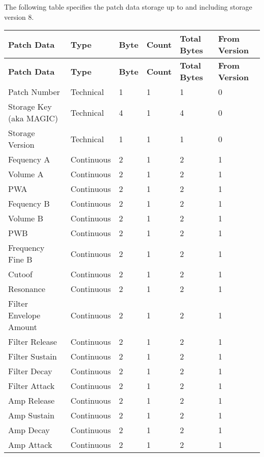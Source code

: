 The following table specifies the patch data storage up to and including storage version 8. 

\footnotesize
\renewcommand{\arraystretch}{1.3}

\begin{longtable}[l]{p{5cm}|p{2cm}|p{1.5cm}|p{1.5cm}|p{2cm}|p{2.5cm}} 
\textbf{Patch Data} & \textbf{Type} & \textbf{Byte} & \textbf{Count} & \textbf{Total Bytes} & \textbf{From Version} \\ \hline
\endfirsthead
\textbf{Patch Data} & \textbf{Type} & \textbf{Byte} & \textbf{Count} & \textbf{Total Bytes} & \textbf{From Version} \\ \hline
\endhead 
Patch Number & Technical & 1 & 1 & 1 & 0 \\ \hline
Storage Key (aka MAGIC) & Technical & 4 & 1 & 4 & 0 \\ \hline
Storage Version & Technical & 1 & 1 & 1 & 0 \\ \hline
Fequency A & Continuous & 2 & 1 & 2 & 1 \\ \hline
Volume A & Continuous & 2 & 1 & 2 & 1 \\ \hline
PWA & Continuous & 2 & 1 & 2 & 1 \\ \hline
Fequency B & Continuous & 2 & 1 & 2 & 1 \\ \hline
Volume B & Continuous & 2 & 1 & 2 & 1 \\ \hline
PWB & Continuous & 2 & 1 & 2 & 1 \\ \hline
Frequency Fine B & Continuous & 2 & 1 & 2 & 1 \\ \hline
Cutoof & Continuous & 2 & 1 & 2 & 1 \\ \hline
Resonance & Continuous & 2 & 1 & 2 & 1 \\ \hline
Filter Envelope Amount & Continuous & 2 & 1 & 2 & 1 \\ \hline
Filter Release & Continuous & 2 & 1 & 2 & 1 \\ \hline
Filter Sustain & Continuous & 2 & 1 & 2 & 1 \\ \hline
Filter Decay & Continuous & 2 & 1 & 2 & 1 \\ \hline
Filter Attack & Continuous & 2 & 1 & 2 & 1 \\ \hline
Amp Release & Continuous & 2 & 1 & 2 & 1 \\ \hline
Amp Sustain & Continuous & 2 & 1 & 2 & 1 \\ \hline
Amp Decay & Continuous & 2 & 1 & 2 & 1 \\ \hline
Amp Attack & Continuous & 2 & 1 & 2 & 1 \\ \hline

\end{longtable}
